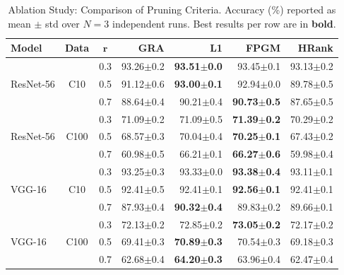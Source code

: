 \begin{table}[htbp]
\centering
\caption{Ablation Study: Comparison of Pruning Criteria. Accuracy (\%) reported as mean $\pm$ std over $N=3$ independent runs. Best results per row are in \textbf{bold}.}
\label{tab:ablation}
\small
\begin{tabular}{@{}lcc|rrrr@{}}
\toprule
\textbf{Model} & \textbf{Data} & $\bm{r}$ & \textbf{GRA} & \textbf{L1} & \textbf{FPGM} & \textbf{HRank} \\
\midrule
\multirow{3}{*}{ResNet-56} & \multirow{3}{*}{C10} 
    & 0.3 & 93.26$\pm$0.2 & \textbf{93.51$\pm$0.0} & 93.45$\pm$0.1 & 93.13$\pm$0.2 \\
  & & 0.5 & 91.12$\pm$0.6 & \textbf{93.00$\pm$0.1} & 92.94$\pm$0.0 & 89.78$\pm$0.5 \\
  & & 0.7 & 88.64$\pm$0.4 & 90.21$\pm$0.4 & \textbf{90.73$\pm$0.5} & 87.65$\pm$0.5 \\
\midrule
\multirow{3}{*}{ResNet-56} & \multirow{3}{*}{C100} 
    & 0.3 & 71.09$\pm$0.2 & 71.09$\pm$0.5 & \textbf{71.39$\pm$0.2} & 70.29$\pm$0.2 \\
  & & 0.5 & 68.57$\pm$0.3 & 70.04$\pm$0.4 & \textbf{70.25$\pm$0.1} & 67.43$\pm$0.2 \\
  & & 0.7 & 60.98$\pm$0.5 & 66.21$\pm$0.1 & \textbf{66.27$\pm$0.6} & 59.98$\pm$0.4 \\
\midrule
\multirow{3}{*}{VGG-16} & \multirow{3}{*}{C10} 
    & 0.3 & 93.25$\pm$0.3 & 93.33$\pm$0.0 & \textbf{93.38$\pm$0.4} & 93.11$\pm$0.1 \\
  & & 0.5 & 92.41$\pm$0.5 & 92.41$\pm$0.1 & \textbf{92.56$\pm$0.1} & 92.41$\pm$0.1 \\
  & & 0.7 & 87.93$\pm$0.4 & \textbf{90.32$\pm$0.4} & 89.83$\pm$0.2 & 89.66$\pm$0.1 \\
\midrule
\multirow{3}{*}{VGG-16} & \multirow{3}{*}{C100} 
    & 0.3 & 72.13$\pm$0.2 & 72.85$\pm$0.2 & \textbf{73.05$\pm$0.2} & 72.17$\pm$0.2 \\
  & & 0.5 & 69.41$\pm$0.3 & \textbf{70.89$\pm$0.3} & 70.54$\pm$0.3 & 69.18$\pm$0.3 \\
  & & 0.7 & 62.68$\pm$0.4 & \textbf{64.20$\pm$0.3} & 63.96$\pm$0.4 & 62.47$\pm$0.4 \\
\bottomrule
\end{tabular}
\end{table}
